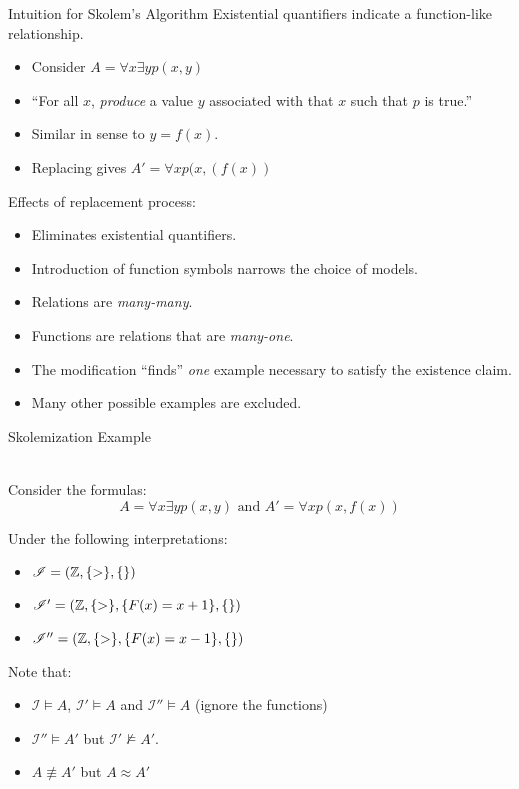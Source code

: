 \documentclass[style=sailor,size=12pt]{powerdot}
\begin{document}
\begin{wideslide}[bm=,toc=]{Intuition for Skolem's Algorithm}
Existential quantifiers indicate a function-like relationship.
\begin{itemize}
\item<2-> Consider $A = \forall x \exists y p(x,y)$
\item<3-> ``For all $x$, \emph{produce} a value $y$ associated with that $x$ such
     that $p$ is true.''
\item<4-> Similar in sense to $y = f(x)$.
\item<5-> Replacing gives $A' = \forall x p(x,(f(x))$
\end{itemize}
\vspace{2ex}
\pause[5]
Effects of replacement process:
\begin{itemize}
\item<7-> Eliminates existential quantifiers.
\item<8-> Introduction of function symbols narrows the choice of models.
\item<9-> Relations are \emph{many-many}.
\item<10-> Functions are relations that are \emph{many-one}.
\item<11-> The modification ``finds'' \emph{one} example necessary to satisfy the existence claim.
\item<12-> Many other possible examples are excluded.
\end{itemize}
\end{wideslide}

\begin{wideslide}[bm=,toc=]{Skolemization Example}
\begin{ex}{9.14}
~\\Consider the formulas:
\vspace{-2ex}
\[A = \forall x \exists y p(x,y) \text{ and } A' = \forall x p(x,f(x))\]
\end{ex}
\vspace{-2ex}
\pause
Under the following interpretations:
\begin{itemize}
\item<3-> $\mathcal{I} = (\mathbb{Z},\{>\},\{\})$
\item<4-> $\mathcal{I}' = (\mathbb{Z},\{>\},\{F(x) = x + 1\},\{\})$
\item<5-> $\mathcal{I}'' = (\mathbb{Z},\{>\},\{F(x) = x - 1\},\{\})$
\end{itemize}
\pause[4]
Note that:
\begin{itemize}
\item $\mathcal{I} \models A$, $\mathcal{I}' \models A$ and $\mathcal{I}''
\models A$ (ignore the functions)
\item $\mathcal{I}'' \models A'$ but $\mathcal{I}' \not \models A'$. 
\item $A \not \equiv A'$ but $A \approx A'$ 
\end{itemize}
\end{wideslide}
\end{document}
